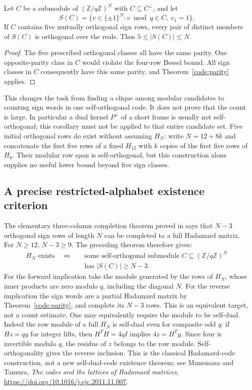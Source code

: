 \begin{corollary}\label{code:five}
Let $C$ be a submodule of $(\mathbb Z/q\mathbb Z)^N$ with
$C\subseteq C^\perp$, and let
\[
 S(C)=\{v\in\{\pm1\}^N:v\bmod q\in C,\ v_1=1\}.
\]
If $C$ contains five mutually orthogonal sign rows, every pair of
distinct members of $S(C)$ is orthogonal over the reals.
Thus $5\le |S(C)|\le N$.
\end{corollary}
\begin{proof}
The five prescribed orthogonal classes all have the same parity.
One opposite-parity class in $C$ would violate the four-row Bessel
bound. All sign classes in $C$ consequently have this same parity,
and Theorem~\ref{code:parity} applies.
\end{proof}

This changes the task from finding a clique among modular candidates
to counting sign words in one self-orthogonal code. It does not prove
that the count is large. In particular a dual kernel $P^\perp$ of a
short frame is usually not self-orthogonal; this corollary must not
be applied to that entire candidate set.
Five initial orthogonal rows do exist without assuming $H_N$:
write $N=12+8k$ and concatenate the first five rows of a fixed
$H_{12}$ with $k$ copies of the first five rows of $H_8$.
Their modular row span is self-orthogonal, but this construction
alone supplies no useful lower bound beyond five sign classes.

\subsection{A precise restricted-alphabet existence criterion}
The elementary three-column completion theorem proved in
 says that $N-3$ orthogonal
sign rows of length $N$ can be completed to a full Hadamard matrix.
For $N\ge12$, $N-3\ge9$. The preceding theorem therefore gives:
\[
 \begin{split}
 H_N\text{ exists}\quad\Longleftrightarrow\quad&
 \text{some self-orthogonal submodule }C\subseteq
 (\mathbb Z/q\mathbb Z)^N\\[-2pt]
 &\text{has }|S(C)|\ge N-3.
 \end{split}
\]
For the forward implication take the module generated by the rows
of $H_N$, whose inner products are zero modulo $q$, including the
diagonal $N$. For the reverse implication the sign words are a
partial Hadamard matrix by Theorem~\ref{code:parity}, and complete
its $N-3$ rows. This is an equivalent target, not a count estimate.
One may equivalently require the module to be self-dual. Indeed the
row module of a full $H_N$ is self-dual even for composite odd $q$:
if $Hz=qy$ for integer lifts, then $H^TH=4qI$ implies
$4z=H^Ty$. Since four is invertible modulo $q$, the residue of
$z$ belongs to the row module. Self-orthogonality gives the reverse
inclusion. This is the classical Hadamard-code construction, not
a new self-dual-code existence theorem; see Munemasa and Tamura,
\emph{The codes and the lattices of Hadamard matrices},
\url{https://doi.org/10.1016/j.ejc.2011.11.007}.

